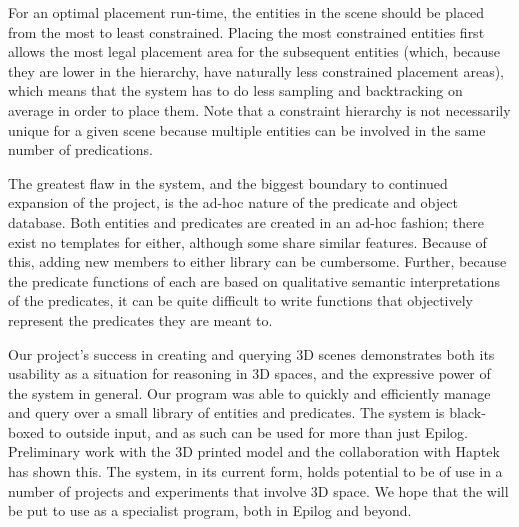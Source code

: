 For an optimal placement run-time, the entities in the scene should be placed from the most to least constrained. Placing the most constrained entities first allows the most legal placement area for the subsequent entities (which, because they are lower in the hierarchy, have naturally less constrained placement areas), which means that the system has to do less sampling and backtracking on average in order to place them.
Note that a constraint hierarchy is not necessarily unique for a given scene because multiple entities can be involved in the same number of predications.

The greatest flaw in the system, and the biggest boundary to continued expansion of the project, is the ad-hoc nature of the predicate and object database. 
Both entities and predicates are created in an ad-hoc fashion; there exist no templates for either, although some share similar features. 
Because of this, adding new members to either library can be cumbersome. 
Further, because the predicate functions of each are based on qualitative semantic interpretations of the predicates, it can be quite difficult to write functions that objectively represent the predicates they are meant to.

Our project's success in creating and querying 3D scenes demonstrates both its usability as a situation for reasoning in 3D spaces, and the expressive power of the system in general. 
Our program was able to quickly and efficiently manage and query over a small library of entities and predicates. 
The system is black-boxed to outside input, and as such can be used for more than just Epilog. Preliminary work with the 3D printed model and the collaboration with Haptek has shown this. The system, in its current form, holds potential to be of use in a number of projects and experiments that involve 3D space. We hope that the \TDS will be put to use as a specialist program, both in Epilog and beyond.